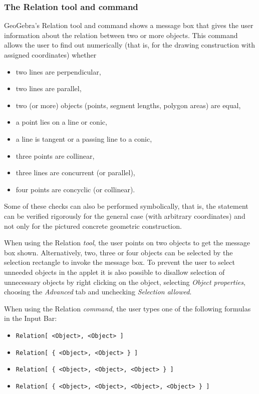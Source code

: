 \documentclass{article}
\begin{document}
\subsubsection{The Relation tool and command}

GeoGebra's Relation tool and command shows a message box that gives the user information about the relation between two or more objects.
This command allows the user to find out numerically (that is, for the drawing construction with assigned coordinates) whether
\begin{itemize}
    \item two lines are perpendicular,
    \item two lines are parallel,
    \item two (or more) objects (points, segment lengths, polygon areas) are equal,
    \item a point lies on a line or conic,
    \item a line is tangent or a passing line to a conic,
    \item three points are collinear,
    \item three lines are concurrent (or parallel),
    \item four points are concyclic (or collinear).
\end{itemize}
Some of these checks can also be performed symbolically, that is, the statement can be verified rigorously for the general case (with arbitrary coordinates) and not only for the pictured concrete geometric construction.

When using the Relation \textit{tool}, the user points on two objects to get the message box shown. Alternatively, two, three or four objects can be selected by the selection rectangle to invoke the message box. To prevent the user to select unneeded objects in the applet it is also possible to disallow selection of unnecessary objects by
right clicking on the object, selecting \textit{Object properties}, choosing the \textit{Advanced} tab and unchecking \textit{Selection allowed}.

When using the Relation \textit{command}, the user types one of the following formulas in the Input Bar:
\begin{itemize}
    \item \texttt{Relation[ <Object>, <Object> ]}
    \item \texttt{Relation[ \{ <Object>, <Object> \} ]}
    \item \texttt{Relation[ \{ <Object>, <Object>, <Object> \} ]}
    \item \texttt{Relation[ \{ <Object>, <Object>, <Object>, <Object> \} ]}
\end{itemize}
\end{document}
